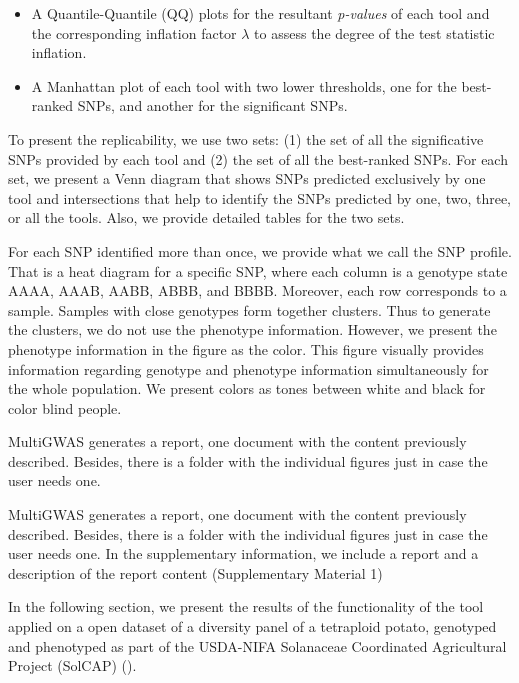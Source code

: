 \documentclass{article}
\begin{document}
\begin{itemize}
\item A Quantile-Quantile (QQ) plots for the resultant \emph{p-values} of each tool and the corresponding inflation factor $\lambda$ to assess the degree of the test statistic inflation. 
\item A Manhattan plot of each tool with two lower thresholds, one for the best-ranked SNPs, and another for the significant SNPs. 
\end{itemize}
To present the replicability, we use two sets: (1) the set of all the significative SNPs provided by each tool and (2) the set of all the best-ranked SNPs. For each set, we present a Venn diagram that shows SNPs predicted exclusively by one tool and intersections that help to identify the SNPs predicted by one, two, three, or all the tools. Also, we provide detailed tables for the two sets.

For each SNP identified more than once, we provide what we call the SNP profile. That is a heat diagram for a specific SNP, where each column is a genotype state AAAA, AAAB, AABB, ABBB, and BBBB. Moreover, each row corresponds to a sample. Samples with close genotypes form together clusters. Thus to generate the clusters, we do not use the phenotype information. However, we present the phenotype information in the figure as the color. This figure visually provides information regarding genotype and phenotype information simultaneously for the whole population. We present colors as tones between white and black for color blind people.

MultiGWAS generates a report, one document with the content previously described. Besides, there is a folder with the individual figures just in case the user needs one.%

MultiGWAS generates a report, one document with the content previously described. Besides, there is a folder with the individual figures just in case the user needs one. \color{blue}
In the supplementary information, we include a report and a description of the report content (Supplementary Material 1)

In the following section, we present the results of the functionality of the tool applied on a open dataset of a diversity panel of a tetraploid potato, genotyped and phenotyped as part of the USDA-NIFA Solanaceae Coordinated Agricultural Project (SolCAP) (\cite{Hirsch2013}).
\color{black}
\end{document}
